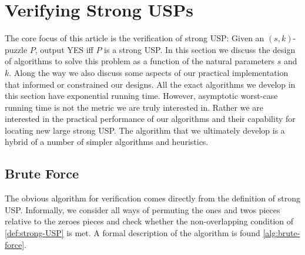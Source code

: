 \documentclass[11pt]{article}
\begin{document}
\section{Verifying Strong USPs}
\label{sec:verify}

The core focus of this article is the verification of strong USP:
Given an $(s,k)$-puzzle $P$, output YES iff $P$ is a strong USP.  In
this section we discuss the design of algorithms to solve this problem
as a function of the natural parameters $s$ and $k$.
Along the way we also discuss some aspects of our practical
implementation that informed or constrained our designs.  All the
exact algorithms we develop in this section have exponential running
time.  However, asymptotic worst-case running time is not the metric
we are truly interested in.  Rather we are interested in the practical
performance of our algorithms and their capability for locating new
large strong USP.  The algorithm that we ultimately develop is a
hybrid of a number of simpler algorithms and heuristics.



\subsection{Brute Force}

The obvious algorithm for verification comes directly from the
definition of strong USP.  Informally, we consider all ways of
permuting the ones and twos pieces relative to the zeroes pieces and
check whether the non-overlapping condition of
\autoref{def:strong-USP} is met.  A formal description of the
algorithm is found \autoref{alg:brute-force}.
\end{document}
